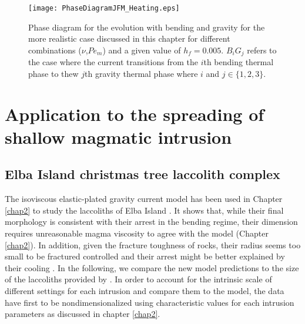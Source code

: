 \begin{figure}[h!]
  \begin{center}
    \graphicspath{ {/Users/thorey/Documents/These/Projet/Refroidissement/Skin_Model/Figure/Figure_Heating/} }
    \texttt{[image: PhaseDiagramJFM\_Heating.eps]}
    \caption{Phase diagram for the  evolution with bending and gravity
      for  the  more realistic  case  discussed  in this  chapter  for
      different  combinations  ($\nu$,$Pe_m$)  and a  given  value  of
      $h_f =  0.005$.  $B_iG_j$ refers  to the case where  the current
      transitions from the  $i$th bending thermal phase  to thew $j$th
      gravity thermal phase where $i$ and $j \in \{1,2,3\}$.}
    \label{C4-Phase_Diagram_Heating}
  \end{center}
\end{figure}

\section{Application to the spreading of shallow magmatic intrusion}
\label{C4-sec:appl-spre-shall}

\subsection{Elba Island christmas tree laccolith complex}
\label{C4-sec:appl-arrest-terr}

The isoviscous elastic-plated  gravity current model has  been used in
Chapter   \ref{chap2}  to   study  the   laccoliths  of   Elba  Island
\citep{Michaut:2011kg}. It shows that, while their final morphology is
consistent with  their arrest in  the bending regime,  their dimension
requires unreasonable magma viscosity to agree with the model (Chapter
\ref{chap2}).   In addition,  given the  fracture toughness  of rocks,
their  radius seems  too small  to be  fractured controlled  and their
arrest    might    be    better    explained    by    their    cooling
\citep{Michaut:2011kg}.  In  the following,  we compare the  new model
predictions   to   the   size    of   the   laccoliths   provided   by
\citet{Rocchi:2002jy}.  In order to account for the intrinsic scale of
different settings for  each intrusion and compare them  to the model,
the  data have  first  to be  nondimensionalized using  characteristic
values  for   each  intrusion  parameters  as   discussed  in  chapter
\ref{chap2}.

